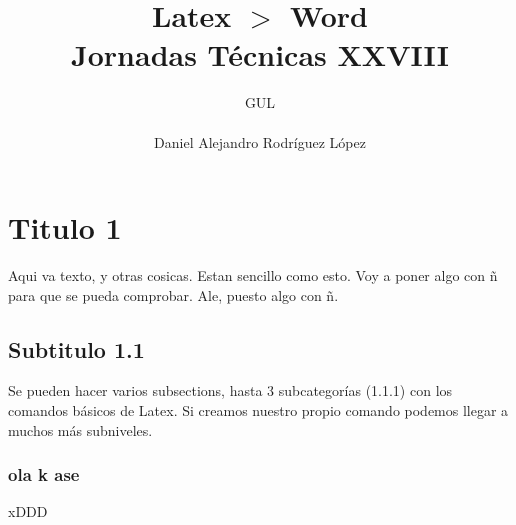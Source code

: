 \documentclass[10pt,a4paper,titlepage]{article} %
\title{ \textbf{ \Huge{Latex $>$ Word}} \\ Jornadas Técnicas XXVIII}
\author{
		\begin{tabular}{l}
			\multicolumn{1}{l}{GUL} \\ \hline \\
			Daniel Alejandro Rodríguez López \\
		\end{tabular}
}
\begin{document}
\maketitle
\newpage

	\section{Titulo 1}
	Aqui va texto, y otras cosicas. Estan sencillo como esto. Voy a poner algo con ñ para que se pueda comprobar. Ale, puesto algo con ñ.

	\subsection{Subtitulo 1.1}
		Se pueden hacer varios subsections, hasta 3 subcategorías (1.1.1) con los comandos básicos de Latex. Si creamos nuestro propio comando podemos llegar a muchos más subniveles. 
		\subsubsection{ola k ase}
			xDDD
\end{document}

